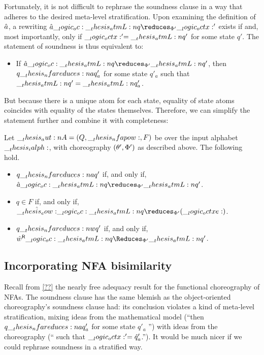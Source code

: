 Fortunately, it is not difficult to rephrase the soundness clause in a way that adheres to the desired meta-level stratification.
Upon examining the definition of $\hat{a}$, a rewriting $\defp{a} \oc \atmL{q} \reduces_{\orsig'} \octx'$ exists if and, most importantly, only if $\__logic_octx:' = \__thesis_atmL:n {q}'$ for some state $q'$.
The statement of soundness is thus equivalent to:
\begin{itemize}
\item If $\defp{a} \oc \atmL{q} \reduces_{\orsig'} \atmL{q}'$, then $q \nfareduces[a] q'_a$ for some state $q'_a$ such that $\__thesis_atmL:n {q}' = \__thesis_atmL:n {q}'_a$.
\end{itemize}
But because there is a unique atom for each state, equality of state atoms coincides with equality of the states themselves.
Therefore, we can simplify the statement further and combine it with completeness:
\begin{corollary}\label{cor:formula-as-process:nfa-oochor-adequacy-simple}
  Let $\__thesis_aut:n {A} = (Q, \__thesis_nfapow:, F)$ be  over the input alphabet $\__thesis_ialph:$, with choreography $(\theta', \Phi')$ as described above.
  The following hold.
  \begin{itemize}[nosep]
  \item $q \nfareduces[a] q'$ if, and only if, $\defp{a} \oc \atmL{q} \reduces_{\orsig'} \atmL{q}'$.
  \item $q \in F$ if, and only if, $\defp{\eow} \oc \atmL{q} \reduces_{\orsig'} (\octxe)$.
  \item $q \nfareduces[w] q'$ if, and only if, $\rev{\defp{w}} \oc \atmL{q} \Reduces_{\orsig'} \atmL{q}'$.
  \end{itemize}
\end{corollary}

\subsection{Incorporating \acs*{NFA} bisimilarity}\label{sec:formula-as-process:nfa-bisim}

Recall from \cref{??} the nearly free adequacy result for the functional choreography of \acp{NFA}.
%
\cornfafnchoradequacy*
%
The soundness clause has the same blemish as the object-oriented choreography's soundness clause had: its conclusion violates a kind of meta-level stratification, mixing ideas from the mathematical model (\enquote{then $q \nfareduces[a] q'_a$ for some state $q'_a$ \textelp{}}) with ideas from the choreography (\enquote{\textelp{} such that $\__logic_octx:' = \hat{q}'_a$.}).
It would be much nicer if we could rephrase soundness in a stratified way.

